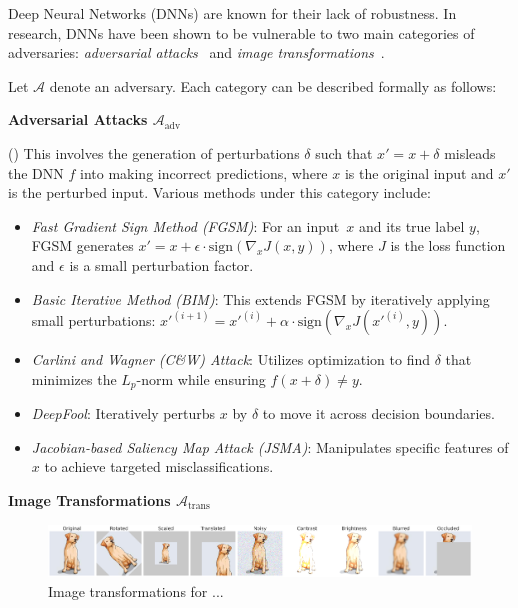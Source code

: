 \documentclass[10pt, conference, a4paper, final]{IEEEtran}
\begin{document}
Deep Neural Networks (DNNs) are known for their lack of robustness. In research, DNNs have been shown to be vulnerable to two main categories of adversaries: \emph{adversarial attacks}~\cite{adv_attacks} and \emph{image transformations}~\cite{deeptest}.

Let $\mathcal{A}$ denote an adversary. Each category can be described formally as follows:

\smallskip\noindent%
\textbf{Adversarial Attacks $\mathcal{A}_{\text{adv}}$}

(\adv) This involves the generation of perturbations $\delta$ such that $x' = x + \delta$ misleads the DNN $f$ into making incorrect predictions, where $x$ is the original input and $x'$ is the perturbed input. Various methods under this category include:
\begin{itemize}[$\bullet$]
    \item \emph{Fast Gradient Sign Method (FGSM)}: For an input~$x$ and its true label $y$, FGSM generates $x' = x + \epsilon \cdot \text{sign}(\nabla_x J(x, y))$, where $J$ is the loss function and $\epsilon$ is a small perturbation factor.
    \item \emph{Basic Iterative Method (BIM)}: This extends FGSM by iteratively applying small perturbations: $x'^{(i+1)} = x'^{(i)} + \alpha \cdot \text{sign}(\nabla_x J(x'^{(i)}, y))$.
    \item \emph{Carlini and Wagner (C\&W) Attack}: Utilizes optimization to find $\delta$ that minimizes the $L_p$-norm while ensuring $f(x + \delta) \neq y$.
    \item \emph{DeepFool}: Iteratively perturbs $x$ by $\delta$ to move it across decision boundaries.
    \item \emph{Jacobian-based Saliency Map Attack (JSMA)}: Manipulates specific features of $x$ to achieve targeted misclassifications.
\end{itemize}

\smallskip\noindent%
\textbf{Image Transformations $\mathcal{A}_{\text{trans}}$}

\begin{figure}
  \centering
  
  \includegraphics[width=\linewidth]{paper_images/output_update.png}
  
  \caption{Image transformations for ...}
  \label{fig:image-trans}
\end{figure}
\end{document}
